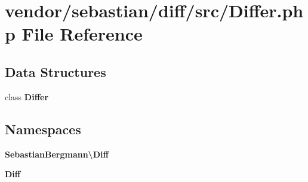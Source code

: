 \section{vendor/sebastian/diff/src/\+Differ.php File Reference}
\label{sebastian_2diff_2src_2_differ_8php}
\subsection*{Data Structures}
\begin{DoxyCompactItemize}
\item 
class {\bf Differ}
\end{DoxyCompactItemize}
\subsection*{Namespaces}
\begin{DoxyCompactItemize}
\item 
 {\bf Sebastian\+Bergmann\textbackslash{}\+Diff}
\item 
 {\bf Diff}
\end{DoxyCompactItemize}

